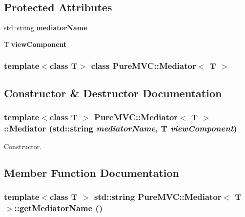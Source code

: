 \subsection*{Protected Attributes}
\begin{DoxyCompactItemize}
\item 
\hypertarget{class_pure_m_v_c_1_1_mediator_a8e09c8faf15ffdf5fe787767fea82df2}{
std::string {\bfseries mediatorName}}
\label{class_pure_m_v_c_1_1_mediator_a8e09c8faf15ffdf5fe787767fea82df2}

\item 
\hypertarget{class_pure_m_v_c_1_1_mediator_ace20a98632a3ce70941ee44a2fdc61fe}{
T {\bfseries viewComponent}}
\label{class_pure_m_v_c_1_1_mediator_ace20a98632a3ce70941ee44a2fdc61fe}

\end{DoxyCompactItemize}
\subsubsection*{template$<$class T$>$ class PureMVC::Mediator$<$ T $>$}



\subsection{Constructor \& Destructor Documentation}
\hypertarget{class_pure_m_v_c_1_1_mediator_ae659a8e8b24a7023a2c4559f840e0ae5}{
\subsubsection[{Mediator}]{\setlength{\rightskip}{0pt plus 5cm}template$<$class T $>$ {\bf PureMVC::Mediator}$<$ T $>$::{\bf Mediator} (std::string {\em mediatorName}, \/  T {\em viewComponent})}}
\label{class_pure_m_v_c_1_1_mediator_ae659a8e8b24a7023a2c4559f840e0ae5}


Constructor. 

\subsection{Member Function Documentation}
\hypertarget{class_pure_m_v_c_1_1_mediator_aa199b499fc1cfae9b49b8336679787a8}{
\subsubsection[{getMediatorName}]{\setlength{\rightskip}{0pt plus 5cm}template$<$class T $>$ std::string {\bf PureMVC::Mediator}$<$ T $>$::getMediatorName ()}}
\label{class_pure_m_v_c_1_1_mediator_aa199b499fc1cfae9b49b8336679787a8}


